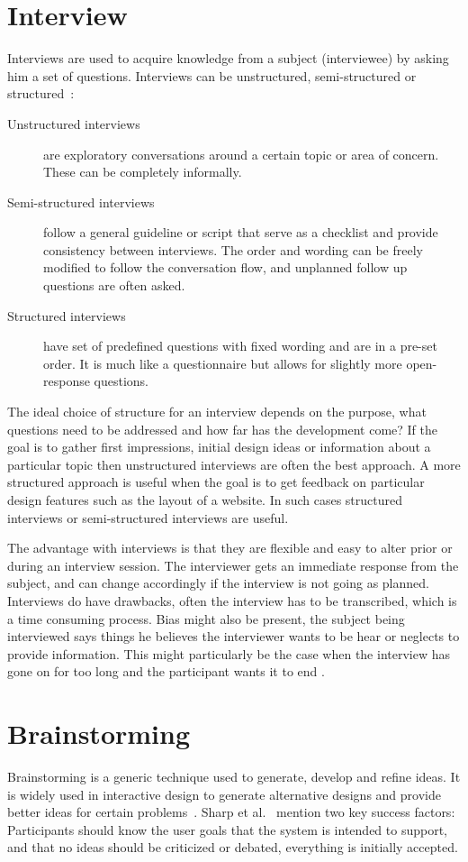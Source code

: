 \section{Interview}
Interviews are used to acquire knowledge from a subject (interviewee) by asking him a set of questions. Interviews can be unstructured, semi-structured or structured~\cite{interactionDesign}:
\begin{description}
  \item[Unstructured interviews] are exploratory conversations around a certain topic or area of concern. These can be completely informally.
  \item[Semi-structured interviews] follow a general guideline or script that serve as a checklist and provide consistency between interviews. The order and wording can be freely modified to follow the conversation flow, and unplanned follow up questions are often asked.
  \item[Structured interviews] have set of predefined questions with fixed wording and are in a pre-set order. It is much like a questionnaire but allows for slightly more open-response questions.
\end{description}

The ideal choice of structure for an interview depends on the purpose, what questions need to be addressed and how far has the development come? If the goal is to gather first impressions, initial design ideas or information about a particular topic then unstructured interviews are often the best approach. A more structured approach is useful when the goal is to get feedback on particular design features such as the layout of a website. In such cases structured interviews or semi-structured interviews are useful.

The advantage with interviews is that they are flexible and easy to alter prior or during an interview session. The interviewer gets an immediate response from the subject, and can change accordingly if the interview is not going as planned. Interviews do have drawbacks, often the interview has to be transcribed, which is a time consuming process. Bias might also be present, the subject being interviewed says things he believes the interviewer wants to be hear or neglects to provide information. This might particularly be the case when the interview has gone on for too long and the participant wants it to end \cite{realWorldResearch}.

\section{Brainstorming}
\label{sec:brainstorming}
Brainstorming is a generic technique used to generate, develop and refine ideas. It is widely used in interactive design to generate alternative designs and provide better ideas for certain problems~\cite{interactionDesign}. Sharp et al.~\cite{interactionDesign} mention two key success factors: Participants should know the user goals that the system is intended to support, and that no ideas should be criticized or debated, everything is initially accepted.

